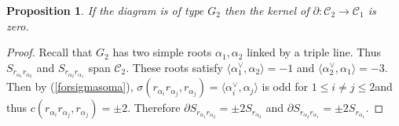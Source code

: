 \documentclass[pdftex]{sigma}
\numberwithin{equation}{section}
\newtheorem{Proposition}[Theorem]{Proposition}
 { \theoremstyle{definition}
\newtheorem{Definition}[Theorem]{Definition}
\newtheorem{Note}[Theorem]{Note}
\newtheorem{Example}[Theorem]{Example}
\newtheorem{Remark}[Theorem]{Remark} }
\begin{document}
\begin{Proposition}\label{pro.kerg2}If the diagram is of type $G_{2}$ then the kernel of $\partial \colon \mathcal{C}_{2}\longrightarrow \mathcal{C}_{1}$ is zero.
\end{Proposition}

\begin{proof}Recall that $G_{2}$ has two simple roots $\alpha _{1},\alpha _{2}$ linked by a triple line. Thus $S_{r_{\alpha _{1}}r_{\alpha _{2}}}$ and $S_{r_{\alpha_{2}}r_{\alpha _{1}}}$ span $\mathcal{C}_{2}$. These roots satisfy $\langle \alpha _{1}^{\vee },\alpha _{2}\rangle =-1$ and $\langle \alpha _{2}^{\vee },\alpha _{1}\rangle =-3$. Then by (\ref{forsigmasoma}), $\sigma (r_{\alpha _{i}}r_{\alpha _{j}},r_{\alpha_{j}})=\langle \alpha _{i}^{\vee },\alpha _{j}\rangle $ is odd for $1\leq i\neq j\leq 2$and thus $c(r_{\alpha _{i}}r_{\alpha_{j}},r_{\alpha _{j}})=\pm 2$. Therefore $\partial S_{r_{\alpha _{1}}r_{\alpha _{2}}}=\pm 2S_{r_{\alpha _{2}}}$ and $\partial S_{r_{\alpha _{2}}r_{\alpha _{1}}}=\pm 2S_{r_{\alpha _{1}}}$.
\end{proof}
\end{document}

